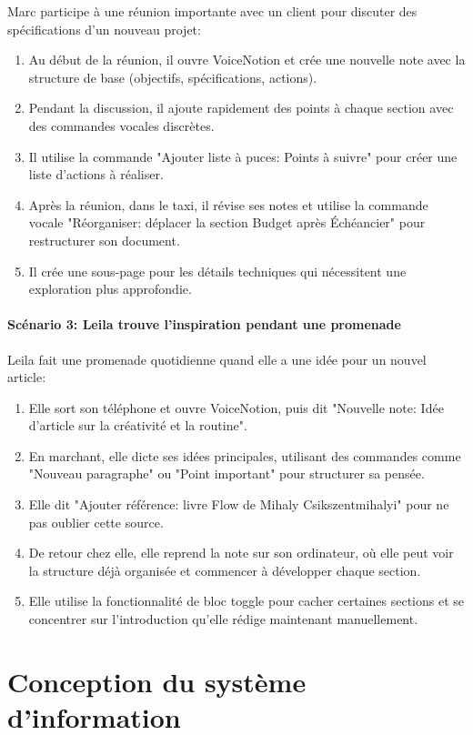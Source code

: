 Marc participe à une réunion importante avec un client pour discuter des spécifications d'un nouveau projet:
\begin{enumerate}
    \item Au début de la réunion, il ouvre VoiceNotion et crée une nouvelle note avec la structure de base (objectifs, spécifications, actions).
    \item Pendant la discussion, il ajoute rapidement des points à chaque section avec des commandes vocales discrètes.
    \item Il utilise la commande "Ajouter liste à puces: Points à suivre" pour créer une liste d'actions à réaliser.
    \item Après la réunion, dans le taxi, il révise ses notes et utilise la commande vocale "Réorganiser: déplacer la section Budget après Échéancier" pour restructurer son document.
    \item Il crée une sous-page pour les détails techniques qui nécessitent une exploration plus approfondie.
\end{enumerate}

\paragraph{Scénario 3: Leila trouve l'inspiration pendant une promenade}

Leila fait une promenade quotidienne quand elle a une idée pour un nouvel article:
\begin{enumerate}
    \item Elle sort son téléphone et ouvre VoiceNotion, puis dit "Nouvelle note: Idée d'article sur la créativité et la routine".
    \item En marchant, elle dicte ses idées principales, utilisant des commandes comme "Nouveau paragraphe" ou "Point important" pour structurer sa pensée.
    \item Elle dit "Ajouter référence: livre Flow de Mihaly Csikszentmihalyi" pour ne pas oublier cette source.
    \item De retour chez elle, elle reprend la note sur son ordinateur, où elle peut voir la structure déjà organisée et commencer à développer chaque section.
    \item Elle utilise la fonctionnalité de bloc toggle pour cacher certaines sections et se concentrer sur l'introduction qu'elle rédige maintenant manuellement.
\end{enumerate}

\section{Conception du système d'information}

